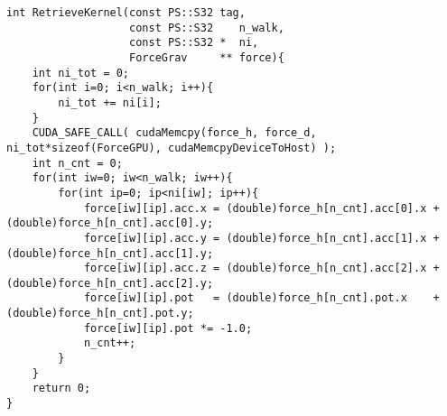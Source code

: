 \begin{lstlisting}[caption=calcForceRetrieve]
int RetrieveKernel(const PS::S32 tag,
                   const PS::S32    n_walk,
                   const PS::S32 *  ni,
                   ForceGrav     ** force){
    int ni_tot = 0;
    for(int i=0; i<n_walk; i++){
        ni_tot += ni[i];
    }
    CUDA_SAFE_CALL( cudaMemcpy(force_h, force_d,      ni_tot*sizeof(ForceGPU), cudaMemcpyDeviceToHost) );
    int n_cnt = 0;
    for(int iw=0; iw<n_walk; iw++){
        for(int ip=0; ip<ni[iw]; ip++){
            force[iw][ip].acc.x = (double)force_h[n_cnt].acc[0].x + (double)force_h[n_cnt].acc[0].y;
            force[iw][ip].acc.y = (double)force_h[n_cnt].acc[1].x + (double)force_h[n_cnt].acc[1].y;
            force[iw][ip].acc.z = (double)force_h[n_cnt].acc[2].x + (double)force_h[n_cnt].acc[2].y;
            force[iw][ip].pot   = (double)force_h[n_cnt].pot.x    + (double)force_h[n_cnt].pot.y;
            force[iw][ip].pot *= -1.0;
            n_cnt++;
        }
    }
    return 0;
}

\end{lstlisting}

